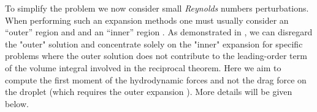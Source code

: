 To simplify the problem we now consider small \textit{Reynolds} numbers perturbations. 
When performing such an expansion methods one must usually consider an ``outer'' region and and an ``inner'' region \citet{proudman1957expansions}. 
As demonstrated in \citet{leal1980, stone2001inertial, raja2010inertial, dabade2015}, we can disregard the "outer" solution and concentrate solely on the "inner" expansion for specific problems where the outer solution does not contribute to the leading-order term of the volume integral involved in the reciprocal theorem.
Here we aim to compute the first moment of the hydrodynamic forces and not the drag force on the droplet (which requires the outer expansion \citep{proudman1957expansions}). 
More details will be given below. %

